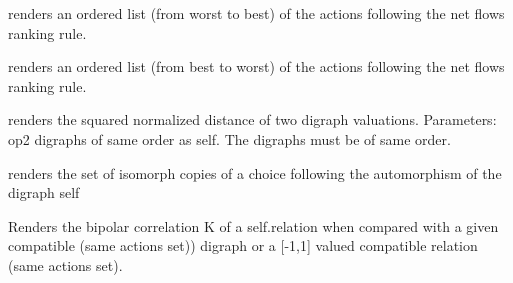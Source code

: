 \documentclass[letterpaper,10pt,english]{sphinxmanual}
\begin{document}
\begin{fulllineitems}
\begin{fulllineitems}
\label{techDoc:digraphs.Digraph.computeNetFlowsOrder}
renders an ordered list (from worst to best) of the actions
following the net flows ranking rule.

\end{fulllineitems}


\begin{fulllineitems}
\label{techDoc:digraphs.Digraph.computeNetFlowsRanking}
renders an ordered list (from best to worst) of the actions
following the net flows ranking rule.

\end{fulllineitems}


\begin{fulllineitems}
\label{techDoc:digraphs.Digraph.computeODistance}
renders the squared normalized distance of
two digraph valuations.
Parameters: op2 digraphs of same order as self.
The digraphs must be of same order.

\end{fulllineitems}


\begin{fulllineitems}
\label{techDoc:digraphs.Digraph.computeOrbit}
renders the set of isomorph copies of a choice following
the automorphism of the digraph self

\end{fulllineitems}


\begin{fulllineitems}
\label{techDoc:digraphs.Digraph.computeOrdinalCorrelation}
Renders the bipolar correlation K of a
self.relation when compared
with a given compatible (same actions set)) digraph or
a {[}-1,1{]} valued compatible relation (same actions set).


\end{fulllineitems}
\end{fulllineitems}
\end{document}
